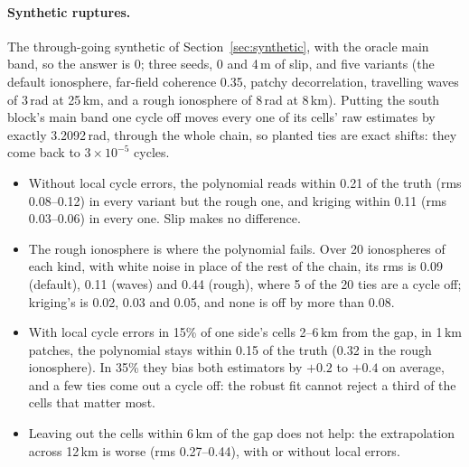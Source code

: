\paragraph{Synthetic ruptures.} The through-going synthetic of Section~\ref{sec:synthetic}, with the oracle main
band, so the answer is 0; three seeds, 0 and 4\,m of slip, and five variants (the default ionosphere, far-field
coherence 0.35, patchy decorrelation, travelling waves of 3\,rad at 25\,km, and a rough ionosphere of 8\,rad at 8\,km).
Putting the south block's main band one cycle off moves every one of its cells' raw estimates by exactly 3.2092\,rad,
through the whole chain, so planted ties are exact shifts: they come back to $3\times10^{-5}$ cycles.
\begin{itemize}
  \item Without local cycle errors, the polynomial reads within 0.21 of the truth (rms 0.08--0.12) in every variant but
        the rough one, and kriging within 0.11 (rms 0.03--0.06) in every one. Slip makes no difference.
  \item The rough ionosphere is where the polynomial fails. Over 20 ionospheres of each kind, with white noise in place
        of the rest of the chain, its rms is 0.09 (default), 0.11 (waves) and 0.44 (rough), where 5 of the 20 ties are
        a cycle off; kriging's is 0.02, 0.03 and 0.05, and none is off by more than 0.08.
  \item With local cycle errors in 15\% of one side's cells 2--6\,km from the gap, in 1\,km patches, the polynomial
        stays within 0.15 of the truth (0.32 in the rough ionosphere). In 35\% they bias both estimators by $+0.2$ to $+0.4$ on
        average, and a few ties come out a cycle off: the robust fit cannot reject a third of the cells that matter most.
  \item Leaving out the cells within 6\,km of the gap does not help: the extrapolation across 12\,km is worse
        (rms 0.27--0.44), with or without local errors.
\end{itemize}

